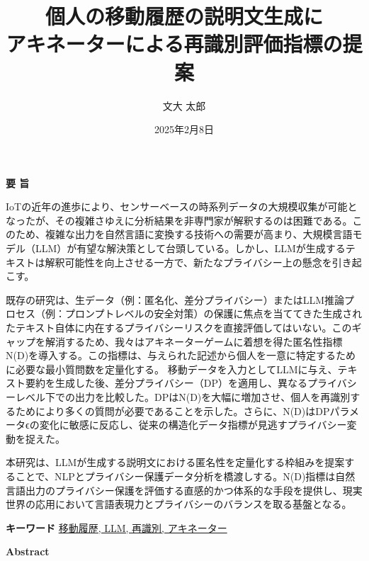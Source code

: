 \documentclass{my_bthesis}
\title{個人の移動履歴の説明文生成に\\アキネーターによる再識別評価指標の提案}
\author{文大 太郎}
\date{2025年2月8日}
\begin{document}
\maketitle

\startabstractpage
{} 

\begin{center}
  {\Large \textbf{要 \quad 旨}} %
\end{center}

IoTの近年の進歩により、センサーベースの時系列データの大規模収集が可能となったが、その複雑さゆえに分析結果を非専門家が解釈するのは困難である。このため、複雑な出力を自然言語に変換する技術への需要が高まり、大規模言語モデル（LLM）が有望な解決策として台頭している。しかし、LLMが生成するテキストは解釈可能性を向上させる一方で、新たなプライバシー上の懸念を引き起こす。

既存の研究は、生データ（例：匿名化、差分プライバシー）またはLLM推論プロセス（例：プロンプトレベルの安全対策）の保護に焦点を当ててきた生成されたテキスト自体に内在するプライバシーリスクを直接評価してはいない。このギャップを解消するため、我々はアキネーターゲームに着想を得た匿名性指標N(D)を導入する。この指標は、与えられた記述から個人を一意に特定するために必要な最小質問数を定量化する。
移動データを入力としてLLMに与え、テキスト要約を生成した後、差分プライバシー（DP）を適用し、異なるプライバシーレベル下での出力を比較した。DPはN(D)を大幅に増加させ、個人を再識別するためにより多くの質問が必要であることを示した。さらに、N(D)はDPパラメータϵの変化に敏感に反応し、従来の構造化データ指標が見逃すプライバシー変動を捉えた。

本研究は、LLMが生成する説明文における匿名性を定量化する枠組みを提案することで、NLPとプライバシー保護データ分析を橋渡しする。N(D)指標は自然言語出力のプライバシー保護を評価する直感的かつ体系的な手段を提供し、現実世界の応用において言語表現力とプライバシーのバランスを取る基盤となる。

\vspace*{1mm}
\begin{center}
\noindent \textbf{キーワード} \underline{移動履歴, LLM, 再識別, アキネーター}
\end{center}
\vspace{0.5em} %

\begin{center}
  {\Large \textbf{Abstract}}
\end{center}
\end{document}
